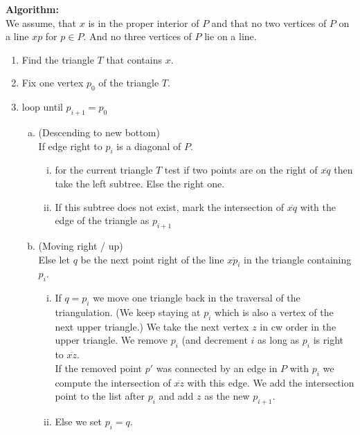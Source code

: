 \documentclass[11pt,a4paper,ngerman]{article}
\begin{document}
\textbf{Algorithm:}\\

We assume, that $x$ is in the proper interior of $P$ and that no two vertices
of $P$ on a line $xp$ for $p \in P$. And no three vertices of $P$ lie on a line.

\begin{enumerate}[1.]
    \item Find the triangle $T$ that contains $x$.
    \item Fix one vertex $p_0$ of the triangle $T$.
    \item loop until $p_{i+1} = p_0$
        \begin{enumerate}[a.]
                \item (Descending to new bottom)\\
                    If edge right to $p_i$ is a diagonal of $P$.
                \begin{enumerate}[(i)]
                    \item for the current triangle $T$ test if
                        two points are on the right of $\overline{xq}$
                        then take the left subtree. Else the right one.
                    \item If this subtree does not exist, mark the intersection
                        of $\overline{xq}$ with the edge of the triangle as
                        $p_{i+1}$
                \end{enumerate}
                \item (Moving right / up)\\
                    Else let $q$ be the next point right of the line 
                    $\overline{xp_i}$ in the triangle containing $p_i$.
                    \begin{enumerate}[(i)]
                        \item If $q = p_i$ we move one triangle back in the
                            traversal of the triangulation. (We keep staying at
                            $p_i$ which is also a vertex of the next upper
                            triangle.)
                            We take the next vertex $z$ in cw order in
                            the upper triangle.
                            We remove $p_i$ (and decrement $i$ as long
                            as $p_i$ is right to $\overline{xz}$.\\
                            
                            If the removed point $p'$ was connected by an edge
                            in $P$ with $p_i$ we compute the intersection of
                            $\overline{xz}$ with this edge. We add the intersection
                            point to the list after $p_i$ and add $z$ as the new $p_{i+1}$.
                        \item Else we set $p_i = q$.
                    \end{enumerate} 
        \end{enumerate}
\end{enumerate}
\end{document}
